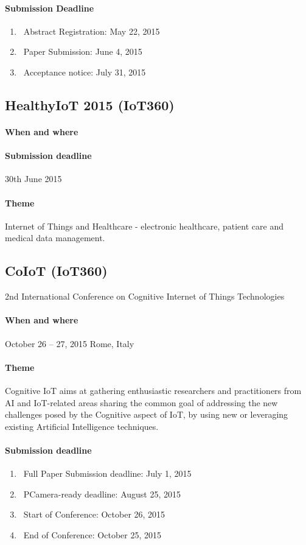 \documentclass[12pt]{article}
\begin{document}
\paragraph{Submission Deadline}
\begin{enumerate}
\item\ Abstract Registration: May 22, 2015
\item\ Paper Submission: June 4, 2015
\item\ Acceptance notice: July 31, 2015

\end{enumerate}

\subsection {HealthyIoT 2015 (IoT360) }
\paragraph {When and where}
\paragraph {Submission deadline} 30th June 2015
\paragraph {Theme} Internet of Things and Healthcare - electronic healthcare, patient care and medical data management.

\subsection {CoIoT (IoT360)} 2nd International Conference on Cognitive Internet of Things Technologies
\paragraph {When and where}  October 26 – 27, 2015 Rome, Italy
\paragraph {Theme} Cognitive IoT aims at gathering enthusiastic researchers and practitioners from AI and IoT-related areas sharing the common goal of addressing the new challenges posed by the Cognitive aspect of IoT, by using new or leveraging existing Artificial Intelligence techniques.

\paragraph {Submission deadline}
\begin{enumerate}
\item\ Full Paper Submission deadline: July 1, 2015
\item\ PCamera-ready deadline: August 25, 2015
\item\ Start of Conference: October 26, 2015
\item\ End of Conference: October 25, 2015
\end{enumerate}
\end{document}
